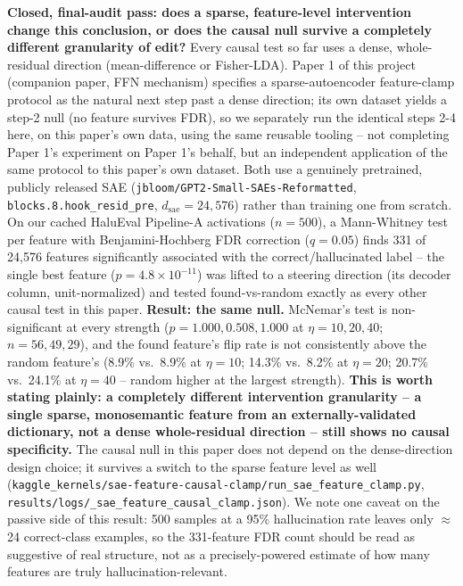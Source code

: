 \documentclass[onecolumn]{jmlr}
\begin{document}
\textbf{Closed, final-audit pass: does a sparse, feature-level
intervention change this conclusion, or does the causal null survive a
completely different granularity of edit?} Every causal test so far
uses a dense, whole-residual direction (mean-difference or Fisher-LDA).
Paper 1 of this project (companion paper, FFN mechanism) specifies a
sparse-autoencoder feature-clamp protocol as the natural next step past
a dense direction; its own dataset yields a step-2 null (no feature
survives FDR), so we separately run the identical steps 2-4 here, on
this paper's own data, using the same reusable tooling -- not completing
Paper 1's experiment on Paper 1's behalf, but an independent application
of the same protocol to this paper's own dataset. Both use a genuinely
pretrained, publicly released SAE
(\texttt{jbloom/\allowbreak GPT2-Small-SAEs-Reformatted},
\texttt{blocks.8.hook\_\allowbreak resid\_\allowbreak pre}, $d_{\text{sae}}=24{,}576$) rather
than training one from scratch. On our cached HaluEval Pipeline-A
activations ($n=500$), a Mann-Whitney test per feature with
Benjamini-Hochberg FDR correction ($q=0.05$) finds 331 of 24,576
features significantly associated with the correct/hallucinated label
-- the single best feature ($p=4.8\times10^{-11}$) was lifted to a
steering direction (its decoder column, unit-normalized) and tested
found-vs-random exactly as every other causal test in this paper.
\textbf{Result: the same null.} McNemar's test is non-significant at
every strength ($p=1.000, 0.508, 1.000$ at $\eta=10,20,40$; $n=56, 49,
29$), and the found feature's flip rate is not consistently above the
random feature's (8.9\% vs.\ 8.9\% at $\eta=10$; 14.3\% vs.\ 8.2\% at
$\eta=20$; 20.7\% vs.\ 24.1\% at $\eta=40$ -- random higher at the
largest strength). \textbf{This is worth stating plainly: a completely
different intervention granularity -- a single sparse, monosemantic
feature from an externally-validated dictionary, not a dense
whole-residual direction -- still shows no causal specificity.} The
causal null in this paper does not depend on the dense-direction
design choice; it survives a switch to the sparse feature level as
well (\texttt{kaggle\_\allowbreak kernels/\allowbreak sae-\allowbreak feature-\allowbreak causal-\allowbreak clamp/\allowbreak run\_\allowbreak sae\_\allowbreak feature\_\allowbreak clamp.py},
\texttt{results/\allowbreak logs/\_\allowbreak sae\_\allowbreak feature\_\allowbreak causal\_\allowbreak clamp.json}). We note
one caveat on the passive side of this result: 500 samples at a 95\%
hallucination rate leaves only $\approx$24 correct-class examples, so
the 331-feature FDR count should be read as suggestive of real
structure, not as a precisely-powered estimate of how many features
are truly hallucination-relevant.
\end{document}
